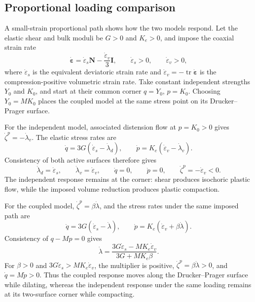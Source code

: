 \documentclass[11pt]{article}
\newcommand{\mbf}[1]{\mathbf{#1}}
\newcommand{\bs}[1]{\boldsymbol{#1}}
\newcommand{\tr}{\operatorname{tr}}
\begin{document}
\subsection{Proportional loading comparison}
\label{sec:loading_comparison}

A small-strain proportional path shows how the two models respond.  Let the
elastic shear and bulk moduli be \(G>0\) and
\(K_e>0\), and impose the coaxial strain rate
\begin{equation*}
	\dot{\bs\varepsilon}
	=\dot\varepsilon_s\mbf N
	-\frac{\dot\varepsilon_v}{3}\mbf I,
	\qquad
	\dot\varepsilon_s>0,
	\qquad
	\dot\varepsilon_v>0,
\end{equation*}
where \(\dot\varepsilon_s\) is the equivalent deviatoric strain rate and
\(\dot\varepsilon_v=-\tr\dot{\bs\varepsilon}\) is the
compression-positive volumetric strain rate.  Take constant independent
strengths \(Y_0\) and \(K_0\), and start at their common corner
\(q=Y_0\), \(p=K_0\).  Choosing \(Y_0=MK_0\) places the coupled model at the
same stress point on its Drucker--Prager surface.

For the independent model, associated distension flow at \(p=K_0>0\) gives
\(\dot\zeta^p=-\dot\lambda_v\).  The elastic stress rates are
\begin{equation*}
	\dot q=3G(\dot\varepsilon_s-\dot\lambda_d),
	\qquad
	\dot p=K_e(\dot\varepsilon_v-\dot\lambda_v).
\end{equation*}
Consistency of both active surfaces therefore gives
\begin{equation*}
	\dot\lambda_d=\dot\varepsilon_s,
	\qquad
	\dot\lambda_v=\dot\varepsilon_v,
	\qquad
	\dot q=0,
	\qquad
	\dot p=0,
	\qquad
	\dot\zeta^p=-\dot\varepsilon_v<0.
\end{equation*}
The independent response remains at the corner: shear produces isochoric
plastic flow, while the imposed volume reduction produces plastic compaction.

For the coupled model, \(\dot\zeta^p=\beta\dot\lambda\), and the stress rates
under the same imposed path are
\begin{equation}
	\dot q=3G(\dot\varepsilon_s-\dot\lambda),
	\qquad
	\dot p=K_e(\dot\varepsilon_v+\beta\dot\lambda).
\label{eq:coupled_stress_rates}
\end{equation}
Consistency of \(q-Mp=0\) gives
\begin{equation}
	\dot\lambda
	=\frac{3G\dot\varepsilon_s-MK_e\dot\varepsilon_v}
	{3G+MK_e\beta}.
\label{eq:coupled_multiplier}
\end{equation}
For \(\beta>0\) and
\(3G\dot\varepsilon_s>MK_e\dot\varepsilon_v\), the multiplier is positive,
\(\dot\zeta^p=\beta\dot\lambda>0\), and
\(\dot q=M\dot p>0\).  Thus the coupled response moves along the
Drucker--Prager surface while dilating, whereas the independent response under
the same loading remains at its two-surface corner while compacting.
\end{document}
